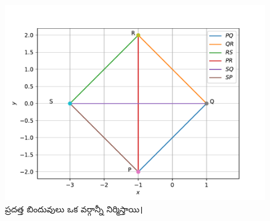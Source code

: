 \begin{enumerate}[label=\thesection.\arabic*.,ref=\thesection.\theenumi]
\begin{figure}[!ht]
	\includegraphics[width=\columnwidth]{figs/quad1.pdf}
	\caption{ప్రదత్త బిందువులు ఒక వర్గాన్నీ నిర్మిస్తాయి।}
	\label{fig:3.5.4_quadrilateral1}
\end{figure}


\end{enumerate}

%


